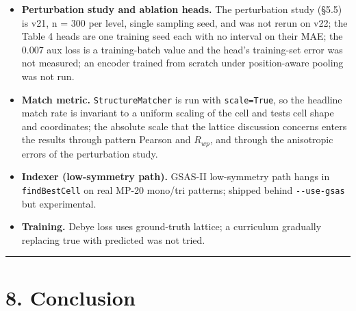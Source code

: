 \documentclass[
  11pt,
]{article}
\begin{document}
\begin{itemize}
  diagnosis is therefore a lower bound on the difficulty of real data,
  not an estimate of it. The \textasciitilde0.5 Å tolerance is a
  property of the sampler under clean cells; under real peak shifts it
  may move, and the indexer's own degradation past \textasciitilde0.10°
  suggests the whole curve shifts towards smaller tolerable errors.
\item
  \textbf{Perturbation study and ablation heads.} The perturbation study
  (§5.5) is v21, n = 300 per level, single sampling seed, and was not
  rerun on v22; the Table 4 heads are one training seed each with no
  interval on their MAE; the 0.007 aux loss is a training-batch value
  and the head's training-set error was not measured; an encoder trained
  from scratch under position-aware pooling was not run.
\item
  \textbf{Match metric.} \texttt{StructureMatcher} is run with
  \texttt{scale=True}, so the headline match rate is invariant to a
  uniform scaling of the cell and tests cell shape and coordinates; the
  absolute scale that the lattice discussion concerns enters the results
  through pattern Pearson and \(R_{wp}\), and through the anisotropic
  errors of the perturbation study.
\item
  \textbf{Indexer (low-symmetry path).} GSAS-II low-symmetry path hangs
  in \texttt{findBestCell} on real MP-20 mono/tri patterns; shipped
  behind \texttt{-\/-use-gsas} but experimental.
\item
  \textbf{Training.} Debye loss uses ground-truth lattice; a curriculum
  gradually replacing true with predicted was not tried.
\end{itemize}

\begin{center}\rule{0.5\linewidth}{0.5pt}\end{center}

\section{8. Conclusion}\label{conclusion}
\end{document}
